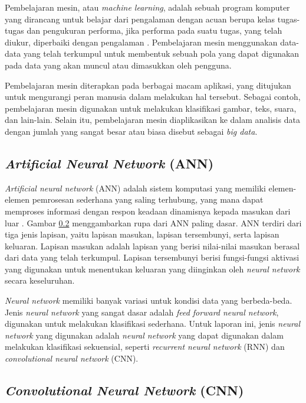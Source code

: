 Pembelajaran mesin, atau \textit{machine learning}, adalah sebuah program komputer yang dirancang untuk belajar dari pengalaman dengan acuan berupa kelas tugas-tugas dan pengukuran performa, jika performa pada suatu tugas, yang telah diukur, diperbaiki dengan pengalaman \parencite{mitchell1997machine}. Pembelajaran mesin menggunakan data-data yang telah terkumpul untuk membentuk sebuah pola yang dapat digunakan pada data yang akan muncul atau dimasukkan oleh pengguna.

Pembelajaran mesin diterapkan pada berbagai macam aplikasi, yang ditujukan untuk mengurangi peran manusia dalam melakukan hal tersebut. Sebagai contoh, pembelajaran mesin digunakan untuk melakukan klasifikasi gambar, teks, suara, dan lain-lain. Selain itu, pembelajaran mesin diaplikasikan ke dalam analisis data dengan jumlah yang sangat besar atau biasa disebut sebagai \textit{big data}.

\subsection{\textit{Artificial Neural Network} (ANN)}

\textit{Artificial neural network} (ANN) adalah sistem komputasi yang memiliki elemen-elemen pemrosesan sederhana yang saling terhubung, yang mana dapat memproses informasi dengan respon keadaan dinamisnya kepada masukan dari luar \parencite{caudill1987neural}. Gambar \ref{} menggambarkan rupa dari ANN paling dasar. ANN terdiri dari tiga jenis lapisan, yaitu lapisan masukan, lapisan tersembunyi, serta lapisan keluaran. Lapisan masukan adalah lapisan yang berisi nilai-nilai masukan berasal dari data yang telah terkumpul. Lapisan tersembunyi berisi fungsi-fungsi aktivasi yang digunakan untuk menentukan keluaran yang diinginkan oleh \textit{neural network} secara keseluruhan.

\textit{Neural network} memiliki banyak variasi untuk kondisi data yang berbeda-beda. Jenis \textit{neural network} yang sangat dasar adalah \textit{feed forward neural network}, digunakan untuk melakukan klasifikasi sederhana. Untuk laporan ini, jenis \textit{neural network} yang digunakan adalah \textit{neural network} yang dapat digunakan dalam melakukan klasifikasi sekuensial, seperti \textit{recurrent neural network} (RNN) dan \textit{convolutional neural network} (CNN).

\subsection{\textit{Convolutional Neural Network} (CNN)}

